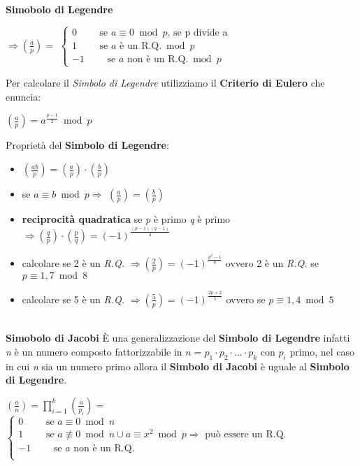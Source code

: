 \textbf{Simobolo di Legendre}
\begin{center}
    $\Rightarrow (\frac{a}{p}) =$
    \begin{math}
        \begin{cases}
            0 \qquad \text{ se } a \equiv 0 \bmod p \text{, se p divide a} \\
            1 \qquad \text{ se } a \text{ è un R.Q.} \bmod p \\
            -1 \qquad \text{ se } a \text{ non è un R.Q.} \bmod p
        \end{cases}
    \end{math}
\end{center}
Per calcolare il \textit{Simbolo di Legendre} utilizziamo il \textbf{Criterio di Eulero} che enuncia:
\begin{center}
    $(\frac{a}{p}) = a^{\frac{p - 1}{2}} \bmod p$
\end{center}
Proprietà del \textbf{Simbolo di Legendre}:
\begin{itemize}
    \item $(\frac{ab}{p}) = (\frac{a}{p}) \cdot (\frac{b}{p})$
    \item se $a \equiv b \bmod p \Rightarrow$ $(\frac{a}{p}) = (\frac{b}{p})$
    \item \textbf{reciprocità quadratica} se \textit{p} è primo \textit{q} è primo $\Rightarrow (\frac{q}{p}) \cdot (\frac{p}{q}) = (-1)^{\frac{(p - 1)(q - 1)}{4}}$
    \item calcolare se 2 è un \textit{R.Q.} $\Rightarrow (\frac{2}{p}) = (-1)^{\frac{p^2 - 1}{8}}$ ovvero 2 è un \textit{R.Q.} se $p \equiv 1, 7 \bmod 8$
    \item calcolare se 5 è un \textit{R.Q.} $\Rightarrow (\frac{5}{p}) = (-1)^{\frac{2p + 2}{5}}$ ovvero se $p \equiv 1, 4 \bmod 5$
\end{itemize}
\   \\
\textbf{Simobolo di Jacobi}
È una generalizzazione del \textbf{Simbolo di Legendre} infatti \textit{n} è un numero composto fattorizzabile in $n = p_1 \cdot p_2 \cdot ... \cdot p_k$ con $p_i$ primo, nel caso in cui \textit{n} sia un numero primo allora il \textbf{Simbolo di Jacobi} è uguale al \textbf{Simbolo di Legendre}.
\begin{center}
    $(\frac{a}{n}) = \prod_{i = 1}^k (\frac{a}{p_i}) =$
    \begin{math}
        \begin{cases}
            0 \qquad \text{ se } a \equiv 0 \bmod n \\
            1 \qquad \text{ se } a \not\equiv 0 \bmod n \cup a \equiv x^2 \bmod p \Rightarrow \text{ può essere un R.Q.}\\
            -1 \qquad \text{ se } a \text{ non è un R.Q.} \\
        \end{cases}
    \end{math}
\end{center}
